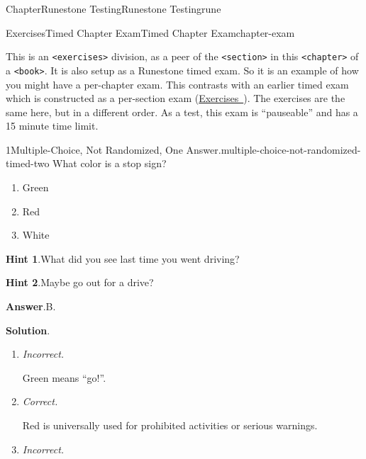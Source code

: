 \documentclass[oneside,10pt,]{book}
\newcommand{\blocktitlefont}{\relax}
\newcommand{\xreffont}{\relax}
\newcommand{\mono}[1]{\texttt{#1}}
\newcommand{\lititle}[1]{{\slshape#1}}
\numberwithin{equation}{section}
\begin{document}
\begin{chapterptx}{Chapter}{Runestone Testing}{}{Runestone Testing}{}{}{rune}
\typeout{************************************************}
%
\begin{exercises-section}{Exercises}{Timed Chapter Exam}{}{Timed Chapter Exam}{}{}{chapter-exam}
\begin{introduction}{}%
This is an \mono{<exercises>} division, as a peer of the \mono{<section>} in this \mono{<chapter>} of a \mono{<book>}.  It is also setup as a Runestone timed exam.  So it is an example of how you might have a per-chapter exam.  This contrasts with an earlier timed exam which is constructed as a per-section exam (\hyperlink{timed-exercises}{Exercises~{\xreffont 5.21}}).  The exercises are the same here, but in a different order.  As a test, this exam is ``pauseable'' and has a 15 minute time limit.%
\end{introduction}%
\begin{divisionexercise}{1}{Multiple-Choice, Not Randomized, One Answer.}{}{multiple-choice-not-randomized-timed-two}%
%
What color is a stop sign?%
\par
%
\begin{enumerate}[label={\Alph*.}]
\item{}Green%
\item{}Red%
\item{}White%
\end{enumerate}
%
\par\smallskip%
\noindent\textbf{\blocktitlefont Hint 1}.\hypertarget{multiple-choice-not-randomized-timed-two-4}{}\quad{}What did you see last time you went driving?%
\par\smallskip%
\noindent\textbf{\blocktitlefont Hint 2}.\hypertarget{multiple-choice-not-randomized-timed-two-5}{}\quad{}Maybe go out for a drive?%
\par\smallskip%
\noindent\textbf{\blocktitlefont Answer}.\hypertarget{multiple-choice-not-randomized-timed-two-6}{}\quad{}B.%
\par\smallskip%
\noindent\textbf{\blocktitlefont Solution}.\hypertarget{multiple-choice-not-randomized-timed-two-7}{}\quad{}%
\begin{enumerate}[label={\Alph*.}]
\item{}\lititle{Incorrect.}\par%
Green means ``go!''.%
\item{}\lititle{Correct.}\par%
Red is universally used for prohibited activities or serious warnings.%
\item{}\lititle{Incorrect.}\par%

\end{enumerate}
\end{divisionexercise}
\end{exercises-section}
\end{chapterptx}
\end{document}
